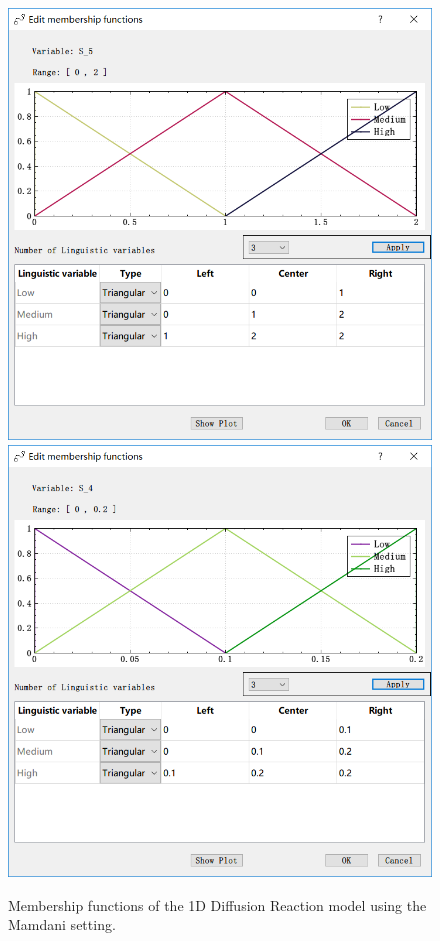 \documentclass[journal,a4paper,onecolumn]{article}
\begin{document}
\begin{figure}[!hbt]
	\begin{center}
		\includegraphics[width=0.45\columnwidth]{fig31}
		\includegraphics[width=0.45\columnwidth]{fig32}
		\caption{Membership functions of the 1D Diffusion Reaction model using the Mamdani setting.}
		\label{fig:Membership functions of 1D Diffusion Reaction using Mamdani.}
	\end{center}
\end{figure}
\end{document}
